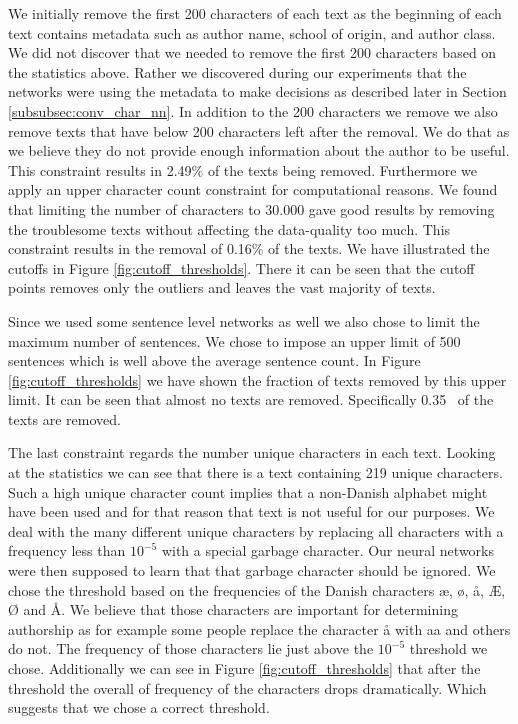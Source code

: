 We initially remove the first 200 characters of each text as the beginning
of each text contains metadata such as author name, school of origin, and
author class. We did not discover that we needed to remove the first 200
characters based on the statistics above. Rather we discovered during our
experiments that the networks were using the metadata to make decisions as
described later in Section \ref{subsubsec:conv_char_nn}. In addition to the
200 characters we remove we also remove texts that have below 200
characters left after the removal. We do that as we believe they do not provide
enough information about the author to be useful. This constraint
results in 2.49\% of the texts being removed. Furthermore we apply an upper character count
constraint for computational reasons. We found that limiting the number of
characters to 30.000 gave good results by removing the troublesome texts without
affecting the data-quality too much. This constraint results in the removal of
0.16\% of the texts. We have illustrated the cutoffs in Figure
\ref{fig:cutoff_thresholds}. There it can be seen that the cutoff points removes
only the outliers and leaves the vast majority of texts.

Since we used some sentence level networks as well we also chose to limit
the maximum number of sentences. We chose to impose an upper limit of
500 sentences which is well above the average sentence count. In Figure
\ref{fig:cutoff_thresholds} we have shown the fraction of texts removed by this
upper limit. It can be seen that almost no texts are removed. Specifically 0.35
\textperthousand\ of the texts are removed.

The last constraint regards the number unique characters in each text. Looking
at the statistics we can see that there is a text containing 219 unique
characters. Such a high unique character count implies that a non-Danish
alphabet might have been used and for that reason that text is not useful for
our purposes. We deal with the many different unique characters by replacing
all characters with a frequency less than $10^{-5}$ with a special garbage
character. Our neural networks were then supposed to learn that that garbage
character should be ignored. We chose the threshold based on the frequencies
of the Danish characters æ, ø, å, Æ, Ø and Å. We believe that those
characters are important for determining authorship as for example some people
replace the character å with aa and others do not. The frequency of those
characters lie just above the $10^{-5}$ threshold we chose. Additionally we can
see in Figure \ref{fig:cutoff_thresholds} that after the threshold the overall
of frequency of the characters drops dramatically. Which suggests that we chose
a correct threshold.

